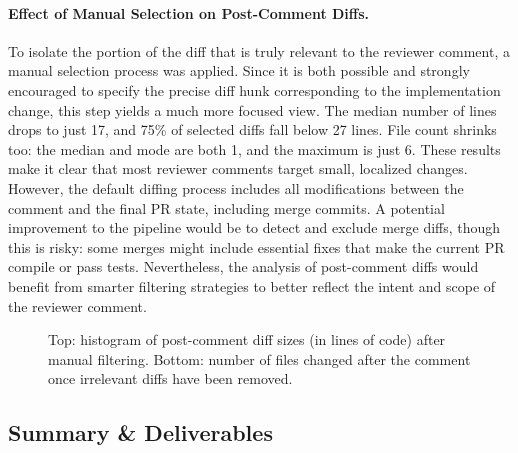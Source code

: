 \paragraph{Effect of Manual Selection on Post-Comment Diffs.}
To isolate the portion of the diff that is truly relevant to the reviewer comment, a manual
selection process was applied. Since it is both possible and strongly encouraged to specify the
precise diff hunk corresponding to the implementation change, this step yields a much more focused
view. The median number of lines drops to just 17, and 75\% of selected diffs fall below 27 lines.
File count shrinks too: the median and mode are both 1, and the maximum is just 6. These results
make it clear that most reviewer comments target small, localized changes. However, the default
diffing process includes all modifications between the comment and the final PR state, including
merge commits. A potential improvement to the pipeline would be to detect and exclude merge diffs,
though this is risky: some merges might include essential fixes that make the current PR compile or
pass tests. Nevertheless, the analysis of post-comment diffs would benefit from smarter filtering
strategies to better reflect the intent and scope of the reviewer comment.

\begin{figure}[ht]
	\centering

	\vspace{1em}


	\caption{Top: histogram of post-comment diff sizes (in lines of code) after manual filtering. Bottom: number of files changed after the comment once irrelevant diffs have been removed.}
	\label{fig:diff-after-filtered}
\end{figure}

\subsection{Summary \& Deliverables}
